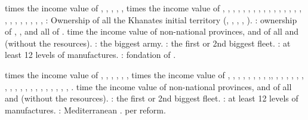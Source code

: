  times the income value of ,
, , ,
, 
 times the income value of ,
, , ,
, , ,
, ,
, , ,
, , ,
, , ,
, , ,
, , ,
 \VPs: Ownership of all the Khanates initial territory
(\paysSteppes, \paysKazan, \paysCosaquesdon, \paysAstrakhan, \paysCrimee).
 \VPs: ownership of \provinceNeva, \provinceLietuva,
\provinceEstland and all of \regionFinlande.
 time the income value of non-national provinces, and of all \COL and
\TP (without the resources).
 \VPs: the biggest army.
 \VPs: the first or 2nd biggest fleet.
 \VPs: at least 12 levels of manufactures.
 \VPs: fondation of .

 times the income value of ,
, , ,
, ,
 times the income value of ,
, , ,
, , ,
, ,,
, , ,
, ,
,  ,
, , ,
, , ,
, , ,
, , 
, .
 time the income value of non-national provinces, and of all \COL and
\TP (without the resources).
 \VPs: the first or 2nd biggest fleet.
 \VPs: at least 12 levels of manufactures.
 \VPs: Mediterranean .
 \VPs per reform.

